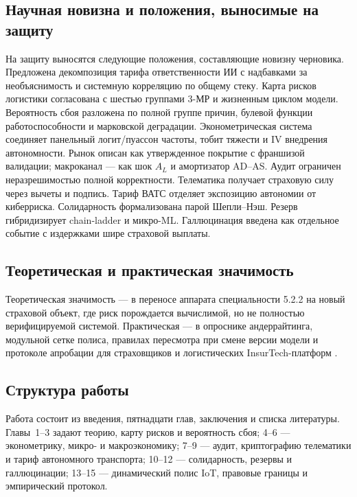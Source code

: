 \documentclass[a4paper,14pt]{extarticle}
\begin{document}
\subsection*{Научная новизна и положения, выносимые на защиту}

На защиту выносятся следующие положения, составляющие новизну черновика. Предложена декомпозиция тарифа ответственности ИИ с надбавками за необъяснимость и системную корреляцию по общему стеку. Карта рисков логистики согласована с шестью группами 3-МР и жизненным циклом модели. Вероятность сбоя разложена по полной группе причин, булевой функции работоспособности и марковской деградации. Эконометрическая система соединяет панельный логит/пуассон частоты, тобит тяжести и IV внедрения автономности. Рынок описан как утвержденное покрытие с франшизой валидации; макроканал --- как шок $A_L$ и амортизатор AD--AS. Аудит ограничен неразрешимостью полной корректности. Телематика получает страховую силу через вычеты и подпись. Тариф ВАТС отделяет экспозицию автономии от киберриска. Солидарность формализована парой Шепли--Нэш. Резерв гибридизирует chain-ladder и микро-ML. Галлюцинация введена как отдельное событие с издержками шире страховой выплаты.

\subsection*{Теоретическая и практическая значимость}

Теоретическая значимость --- в переносе аппарата специальности 5.2.2 на новый страховой объект, где риск порождается вычислимой, но не полностью верифицируемой системой. Практическая --- в опроснике андеррайтинга, модульной сетке полиса, правилах пересмотра при смене версии модели и протоколе апробации для страховщиков и логистических InsurTech-платформ \cite{insurtech, sabitov}.

\subsection*{Структура работы}

Работа состоит из введения, пятнадцати глав, заключения и списка литературы. Главы~1--3 задают теорию, карту рисков и вероятность сбоя; 4--6 --- эконометрику, микро- и макроэкономику; 7--9 --- аудит, криптографию телематики и тариф автономного транспорта; 10--12 --- солидарность, резервы и галлюцинации; 13--15 --- динамический полис IoT, правовые границы и эмпирический протокол.
\newpage
\end{document}

